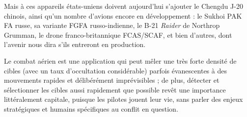 	Mais à ces appareils états-uniens doivent aujourd'hui s'ajouter le Chengdu J-20 chinois, ainsi qu'un nombre d'avions encore en développement : le Sukhoi PAK FA russe, sa variante FGFA russo-indienne, le B-21 \emph{Raider} de Northrop Grumman, le drone franco-britannique FCAS/SCAF, et bien d'autres, dont l'avenir nous dira s'ils entreront en production.
	
	Le combat aérien est une application qui peut mêler une très forte densité de cibles (avec un taux d'occultation considérable) parfois évanescentes à des mouvements rapides et délibérément imprévisibles ; de plus, détecter et sélectionner les cibles aussi rapidement que possible revêt une importance littéralement capitale, puisque les pilotes jouent leur vie, sans parler des enjeux stratégiques et humains spécifiques au conflit en question.
	




	
